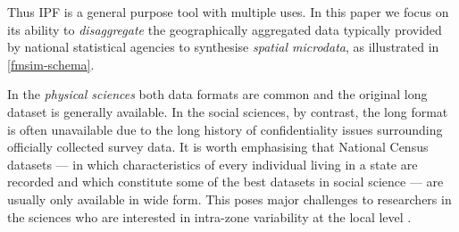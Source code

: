 \documentclass[a4paper,10pt]{article}
\begin{document}
Thus IPF is a general purpose tool with multiple uses. In this paper we focus on its
ability to \emph{disaggregate} the geographically aggregated data typically
provided by national statistical agencies to synthesise \emph{spatial microdata},
as illustrated in \cref{fmsim-schema}.
%
%

In the \emph{physical sciences} both data formats are common and the
original long dataset is generally available. In the social sciences, by contrast, the long format is often unavailable
due to the long history of confidentiality
issues surrounding officially collected survey data.
It is worth emphasising that National Census datasets --- in which characteristics of
every individual living in a state are recorded and which constitute some of the best datasets in social science ---
are usually only available
in wide form. This poses major challenges to researchers in the sciences who are
interested in intra-zone variability at the local level \citep{Whitworth2012,Lee2009}.
\end{document}
